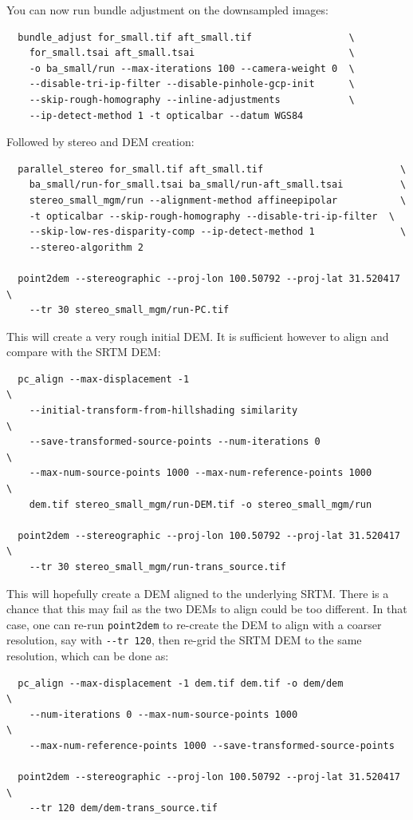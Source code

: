 You can now run bundle adjustment on the downsampled images:

\begin{verbatim}
  bundle_adjust for_small.tif aft_small.tif                 \
    for_small.tsai aft_small.tsai                           \
    -o ba_small/run --max-iterations 100 --camera-weight 0  \
    --disable-tri-ip-filter --disable-pinhole-gcp-init      \
    --skip-rough-homography --inline-adjustments            \
    --ip-detect-method 1 -t opticalbar --datum WGS84
\end{verbatim}

Followed by stereo and DEM creation:

\begin{verbatim}
  parallel_stereo for_small.tif aft_small.tif                        \
    ba_small/run-for_small.tsai ba_small/run-aft_small.tsai          \
    stereo_small_mgm/run --alignment-method affineepipolar           \
    -t opticalbar --skip-rough-homography --disable-tri-ip-filter  \
    --skip-low-res-disparity-comp --ip-detect-method 1               \
    --stereo-algorithm 2 

  point2dem --stereographic --proj-lon 100.50792 --proj-lat 31.520417 \
    --tr 30 stereo_small_mgm/run-PC.tif
\end{verbatim}

This will create a very rough initial DEM. It is sufficient however
to align and compare with the SRTM DEM:

\begin{verbatim}
  pc_align --max-displacement -1                                      \
    --initial-transform-from-hillshading similarity                   \
    --save-transformed-source-points --num-iterations 0               \
    --max-num-source-points 1000 --max-num-reference-points 1000      \
    dem.tif stereo_small_mgm/run-DEM.tif -o stereo_small_mgm/run

  point2dem --stereographic --proj-lon 100.50792 --proj-lat 31.520417 \
    --tr 30 stereo_small_mgm/run-trans_source.tif
\end{verbatim}

This will hopefully create a DEM aligned to the underlying SRTM. There
is a chance that this may fail as the two DEMs to align could be too
different. In that case, one can re-run \texttt{point2dem} to re-create
the DEM to align with a coarser resolution, say with \texttt{-\/-tr
120}, then re-grid the SRTM DEM to the same resolution, which can be
done as:

\begin{verbatim}
  pc_align --max-displacement -1 dem.tif dem.tif -o dem/dem             \
    --num-iterations 0 --max-num-source-points 1000                     \
    --max-num-reference-points 1000 --save-transformed-source-points

  point2dem --stereographic --proj-lon 100.50792 --proj-lat 31.520417   \
    --tr 120 dem/dem-trans_source.tif
\end{verbatim}

